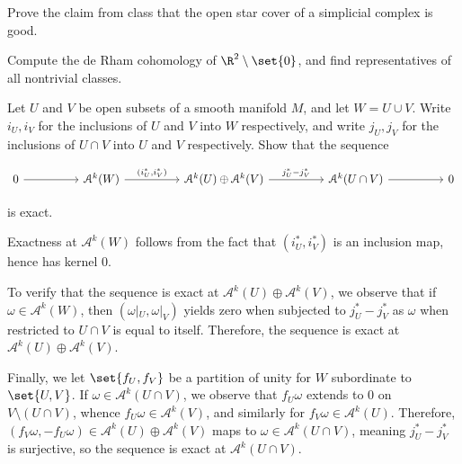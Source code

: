 \documentclass[10pt]{mypackage}
\begin{document}
\RaggedRight
\begin{problem}[Problem 2]
  Prove the claim from class that the open star cover of a simplicial complex is good.
\end{problem}
\begin{problem}[Problem 4]
  Compute the de Rham cohomology of $\R^{2}\setminus \set{0}$, and find representatives of all nontrivial classes.
\end{problem}
\begin{problem}[Problem 6]
  Let $U$ and $V$ be open subsets of a smooth manifold $M$, and let $W = U\cup V$. Write $i_U,i_V$ for the inclusions of $U$ and $V$ into $W$ respectively, and write $j_U,j_V$ for the inclusions of $U\cap V$ into $U$ and $V$ respectively. Show that the sequence 
  \begin{center}
\[\begin{tikzcd}
	0 && {\mathcal{A}^k(W)} && {\mathcal{A}^{k}(U)\oplus\mathcal{A}^{k}(V)} && {\mathcal{A}^{k}(U\cap V)} && 0
	\arrow[from=1-1, to=1-3]
	\arrow["{\left(i_U^{\ast},i_V^{\ast}\right)}", from=1-3, to=1-5]
	\arrow["{j_U^{\ast}-j_V^{\ast}}", from=1-5, to=1-7]
	\arrow[from=1-7, to=1-9]
\end{tikzcd}\]
  \end{center}
  is exact.
\end{problem}
\begin{solution}
  Exactness at $\mathcal{A}^{k}\left( W \right)$ follows from the fact that $\left( i_U^{\ast},i_V^{\ast} \right)$ is an inclusion map, hence has kernel $0$.\newline

  To verify that the sequence is exact at $\mathcal{A}^{k}\left( U \right)\oplus \mathcal{A}^{k}\left( V \right)$, we observe that if $\omega\in \mathcal{A}^{k}\left( W \right)$, then $\left( \omega|_{U},\omega|_{V} \right)$ yields zero when subjected to $j_U^{\ast}-j_V^{\ast}$ as $\omega$ when restricted to $U\cap V$ is equal to itself. Therefore, the sequence is exact at $\mathcal{A}^{k}\left( U \right)\oplus \mathcal{A}^{k}\left( V \right)$.\newline

  Finally, we let $\set{f_U,f_V}$ be a partition of unity for $W$ subordinate to $\set{U,V}$. If $\omega\in \mathcal{A}^{k}\left( U\cap V \right)$, we observe that $f_U\omega$ extends to $0$ on $V\setminus \left( U\cap V \right)$, whence $f_U\omega\in \mathcal{A}^{k}\left( V \right)$, and similarly for $f_V\omega\in \mathcal{A}^{k}\left( U \right)$. Therefore, $\left( f_V\omega,-f_U\omega \right)\in \mathcal{A}^{k}\left( U \right)\oplus \mathcal{A}^{k}\left( V \right)$ maps to $\omega\in \mathcal{A}^{k}\left( U\cap V \right)$, meaning $j_U^{\ast}-j_V^{\ast}$ is surjective, so the sequence is exact at $\mathcal{A}^{k}\left( U\cap V \right)$.
\end{solution}
\end{document}
